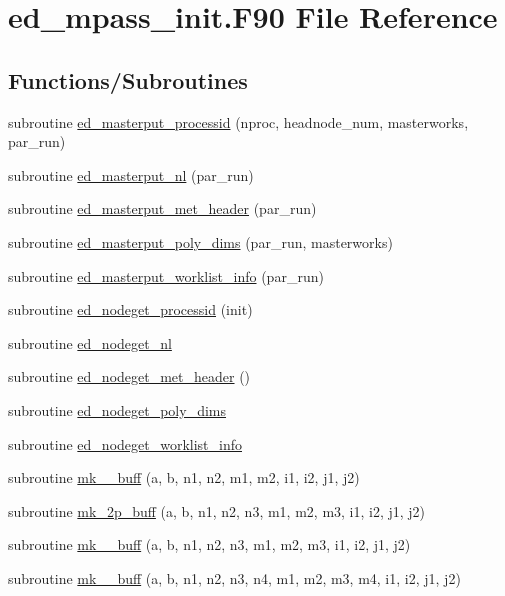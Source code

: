 \hypertarget{ed__mpass__init_8_f90}{}\section{ed\+\_\+mpass\+\_\+init.\+F90 File Reference}
\label{ed__mpass__init_8_f90}
\subsection*{Functions/\+Subroutines}
\begin{DoxyCompactItemize}
\item 
subroutine \hyperlink{ed__mpass__init_8_f90_a78fbd18a00870b2ba2577524102b6730}{ed\+\_\+masterput\+\_\+processid} (nproc, headnode\+\_\+num, masterworks, par\+\_\+run)
\item 
subroutine \hyperlink{ed__mpass__init_8_f90_a240d6cf9664c6058b39e17a9d98b8dc1}{ed\+\_\+masterput\+\_\+nl} (par\+\_\+run)
\item 
subroutine \hyperlink{ed__mpass__init_8_f90_a8f64604ca973c6e8458295ee11bef097}{ed\+\_\+masterput\+\_\+met\+\_\+header} (par\+\_\+run)
\item 
subroutine \hyperlink{ed__mpass__init_8_f90_ab8edb5262c6398dd001aecd5144ff6ad}{ed\+\_\+masterput\+\_\+poly\+\_\+dims} (par\+\_\+run, masterworks)
\item 
subroutine \hyperlink{ed__mpass__init_8_f90_a92ea90e711dba589f46d6e84f21526c8}{ed\+\_\+masterput\+\_\+worklist\+\_\+info} (par\+\_\+run)
\item 
subroutine \hyperlink{ed__mpass__init_8_f90_a1c980ac7ad5de486780a351778cfb786}{ed\+\_\+nodeget\+\_\+processid} (init)
\item 
subroutine \hyperlink{ed__mpass__init_8_f90_a71a6170aace1990f255b9da08adc81cf}{ed\+\_\+nodeget\+\_\+nl}
\item 
subroutine \hyperlink{ed__mpass__init_8_f90_a7c43c6c7ffb1ec5ba35396470e532068}{ed\+\_\+nodeget\+\_\+met\+\_\+header} ()
\item 
subroutine \hyperlink{ed__mpass__init_8_f90_aa2fb2a5427c2e9a8ae20d387ca95a66e}{ed\+\_\+nodeget\+\_\+poly\+\_\+dims}
\item 
subroutine \hyperlink{ed__mpass__init_8_f90_a5ad92c335f14b12bdba706f520c2e3e8}{ed\+\_\+nodeget\+\_\+worklist\+\_\+info}
\item 
subroutine \hyperlink{ed__mpass__init_8_f90_a823841fc5517128f18a832c05da17bd2}{mk\+\_\+\_\+buff} (a, b, n1, n2, m1, m2, i1, i2, j1, j2)
\item 
subroutine \hyperlink{ed__mpass__init_8_f90_ac4c9e3770866998347e7e25b8bc4bc0e}{mk\+\_\+2p\+\_\+buff} (a, b, n1, n2, n3, m1, m2, m3, i1, i2, j1, j2)
\item 
subroutine \hyperlink{ed__mpass__init_8_f90_ac82cfd8beb6e947b6fae3ee783654464}{mk\+\_\+\_\+buff} (a, b, n1, n2, n3, m1, m2, m3, i1, i2, j1, j2)
\item 
subroutine \hyperlink{ed__mpass__init_8_f90_a19a019e7fd726ea88eeb517f9e1db3cb}{mk\+\_\+\_\+buff} (a, b, n1, n2, n3, n4, m1, m2, m3, m4, i1, i2, j1, j2)
\end{DoxyCompactItemize}


